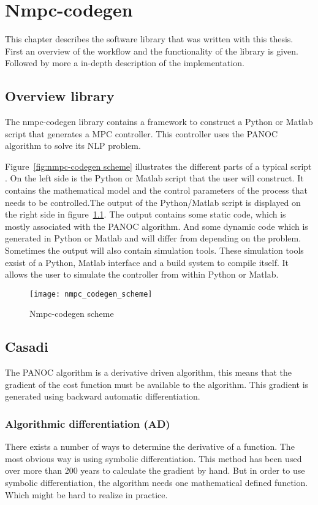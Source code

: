 \chapter{Nmpc-codegen}
This chapter describes the software library that was written with this thesis. First an overview of the workflow and the functionality of the library is given. Followed by more a in-depth description of the implementation.
\section{Overview library}
The nmpc-codegen library contains a framework to construct a Python or Matlab script that generates a MPC controller. This controller uses the PANOC algorithm to solve its NLP problem.

Figure~\eqref{fig:nmpc-codegen scheme} illustrates the different parts of a typical script . On the left side is the Python or Matlab script that the user will construct. It contains the mathematical model and the control parameters of the process that needs to be controlled.The output of the Python/Matlab script is displayed on the right side in figure~\ref{fig:nmpc-codegen scheme}. The output contains some static code, which is mostly associated with the PANOC algorithm. And some dynamic code which is generated in Python or Matlab and will differ from depending on the problem. Sometimes the output will also contain simulation tools. These simulation tools exsist of a Python, Matlab interface and a build system to compile itself. It allows the user to simulate the controller from within Python or Matlab.
	\begin{figure}[H]
		\centering
		\texttt{[image: nmpc\_codegen\_scheme]}
		\caption{Nmpc-codegen scheme}
		\label{fig:nmpc-codegen scheme}
	\end{figure}

\section{Casadi}
The PANOC algorithm is a derivative driven algorithm, this means that the gradient of the cost function must be available to the algorithm. This gradient is generated using backward automatic differentiation.

\subsection{Algorithmic differentiation (AD)}
There exists a number of ways to determine the derivative of a function. The most obvious way is using symbolic differentiation. This method has been used over more than 200 years to calculate the gradient by hand. But in order to use symbolic differentiation, the algorithm needs one mathematical defined function. Which might be hard to realize in practice.

